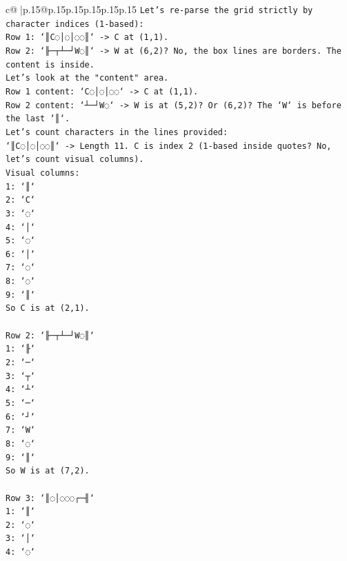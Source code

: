\documentclass{article}
\begin{document}
{\begin{supertabular}{c@{$\;$}|p{.15\linewidth}@{}p{.15\linewidth}p{.15\linewidth}p{.15\linewidth}p{.15\linewidth}p{.15\linewidth}}
{{{\texttt{Let's re{-}parse the grid strictly by character indices (1{-}based):} \\
\texttt{Row 1: `║C◌│◌│◌◌║` {-}> C at (1,1).} \\
\texttt{Row 2: `╟─┬┴─┘W◌║` {-}> W at (6,2)? No, the box lines are borders. The content is inside.} \\
\texttt{Let's look at the "content" area.} \\
\texttt{Row 1 content: `C◌│◌│◌◌` {-}> C at (1,1).} \\
\texttt{Row 2 content: `┴─┘W◌` {-}> W is at (5,2)? Or (6,2)? The `W` is before the last `║`.} \\
\texttt{Let's count characters in the lines provided:} \\
\texttt{`║C◌│◌│◌◌║` {-}> Length 11. C is index 2 (1{-}based inside quotes? No, let's count visual columns).} \\
\texttt{Visual columns:} \\
\texttt{1: `║`} \\
\texttt{2: `C`} \\
\texttt{3: `◌`} \\
\texttt{4: `│`} \\
\texttt{5: `◌`} \\
\texttt{6: `│`} \\
\texttt{7: `◌`} \\
\texttt{8: `◌`} \\
\texttt{9: `║`} \\
\texttt{So C is at (2,1).} \\
\\ 
\texttt{Row 2: `╟─┬┴─┘W◌║`} \\
\texttt{1: `╟`} \\
\texttt{2: `─`} \\
\texttt{3: `┬`} \\
\texttt{4: `┴`} \\
\texttt{5: `─`} \\
\texttt{6: `┘`} \\
\texttt{7: `W`} \\
\texttt{8: `◌`} \\
\texttt{9: `║`} \\
\texttt{So W is at (7,2).} \\
\\ 
\texttt{Row 3: `║◌│◌◌◌┌─╢`} \\
\texttt{1: `║`} \\
\texttt{2: `◌`} \\
\texttt{3: `│`} \\
\texttt{4: `◌`} \\
}}}
\end{supertabular}}
\end{document}
